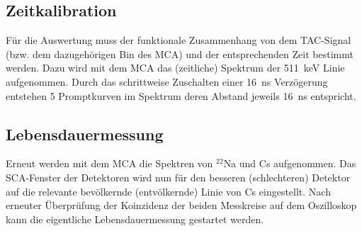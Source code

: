 \subsection{Zeitkalibration}
Für die Auswertung muss der funktionale Zusammenhang von dem TAC-Signal (bzw. dem dazugehörigen Bin des MCA) und der entsprechenden Zeit bestimmt werden. Dazu wird mit dem MCA das (zeitliche) Spektrum der \SI{511}{\kilo\electronvolt} Linie aufgenommen. Durch das schrittweise Zuschalten einer \SI{16}{\nano\second} Verzögerung entstehen 5 Promptkurven im Spektrum deren Abstand jeweils \SI{16}{\nano\second} entspricht. 

\subsection{Lebensdauermessung}
Erneut werden mit dem MCA die Spektren von $^{22}$Na und Cs aufgenommen. Das SCA-Fenster der Detektoren wird nun für den besseren (schlechteren) Detektor auf die relevante bevölkernde (entvölkernde) Linie von Cs eingestellt. Nach erneuter Überprüfung der Koinzidenz der beiden Messkreise auf dem Oszilloskop kann die eigentliche Lebensdauermessung gestartet werden. 
